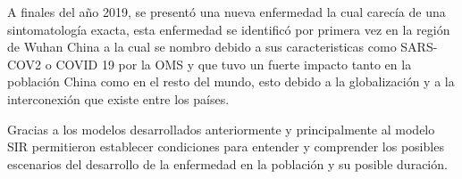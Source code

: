 A finales del año 2019, se presentó una nueva enfermedad la cual carecía de una sintomatología exacta, esta enfermedad se identificó por primera vez en la región de Wuhan China a la cual se nombro debido a sus caracteristicas como SARS-COV2 o COVID 19 por la OMS y que tuvo un fuerte impacto tanto en la población China como en el resto del mundo, esto debido a la globalización y a la interconexión que existe entre los países.

Gracias a los modelos desarrollados anteriormente y principalmente al modelo SIR permitieron establecer condiciones para entender y comprender los posibles escenarios del desarrollo de la enfermedad en la población y su posible duración.
